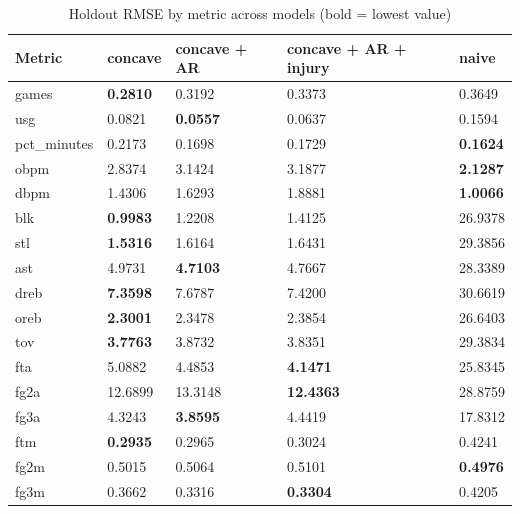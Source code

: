 \begin{table}
\caption{Holdout RMSE by metric across models (bold = lowest value)}
\label{tab:holdout_rmse_all_models}
\begin{tabular}{lllll}
\toprule
Metric & concave & concave + AR & concave + AR + injury & naive \\
\midrule
games & \textbf{0.2810} & 0.3192 & 0.3373 & 0.3649 \\
usg & 0.0821 & \textbf{0.0557} & 0.0637 & 0.1594 \\
pct_minutes & 0.2173 & 0.1698 & 0.1729 & \textbf{0.1624} \\
obpm & 2.8374 & 3.1424 & 3.1877 & \textbf{2.1287} \\
dbpm & 1.4306 & 1.6293 & 1.8881 & \textbf{1.0066} \\
blk & \textbf{0.9983} & 1.2208 & 1.4125 & 26.9378 \\
stl & \textbf{1.5316} & 1.6164 & 1.6431 & 29.3856 \\
ast & 4.9731 & \textbf{4.7103} & 4.7667 & 28.3389 \\
dreb & \textbf{7.3598} & 7.6787 & 7.4200 & 30.6619 \\
oreb & \textbf{2.3001} & 2.3478 & 2.3854 & 26.6403 \\
tov & \textbf{3.7763} & 3.8732 & 3.8351 & 29.3834 \\
fta & 5.0882 & 4.4853 & \textbf{4.1471} & 25.8345 \\
fg2a & 12.6899 & 13.3148 & \textbf{12.4363} & 28.8759 \\
fg3a & 4.3243 & \textbf{3.8595} & 4.4419 & 17.8312 \\
ftm & \textbf{0.2935} & 0.2965 & 0.3024 & 0.4241 \\
fg2m & 0.5015 & 0.5064 & 0.5101 & \textbf{0.4976} \\
fg3m & 0.3662 & 0.3316 & \textbf{0.3304} & 0.4205 \\
\bottomrule
\end{tabular}
\end{table}
